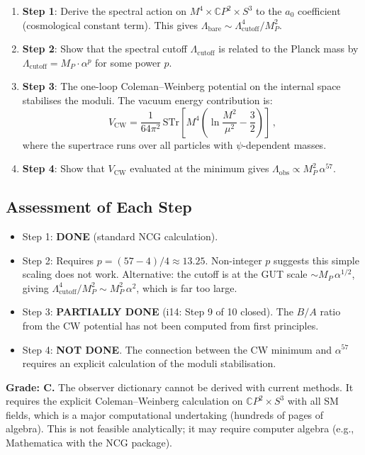 \documentclass[11pt,a4paper]{article}
\newcommand{\CP}{\mathbb{C}P}
\begin{document}
\begin{enumerate}
\item \textbf{Step 1}: Derive the spectral action on $M^4 \times \CP^2 \times S^3$ to the $a_0$ coefficient (cosmological constant term). This gives $\Lambda_{\mathrm{bare}} \sim \Lambda_{\mathrm{cutoff}}^4 / M_P^2$.

\item \textbf{Step 2}: Show that the spectral cutoff $\Lambda_{\mathrm{cutoff}}$ is related to the Planck mass by $\Lambda_{\mathrm{cutoff}} = M_P \cdot \alpha^p$ for some power $p$.

\item \textbf{Step 3}: The one-loop Coleman--Weinberg potential on the internal space stabilises the moduli. The vacuum energy contribution is:
\begin{equation}
V_{\mathrm{CW}} = \frac{1}{64\pi^2}\,\mathrm{STr}\left[M^4\left(\ln\frac{M^2}{\mu^2} - \frac{3}{2}\right)\right]\,,
\end{equation}
where the supertrace runs over all particles with $\psi$-dependent masses.

\item \textbf{Step 4}: Show that $V_{\mathrm{CW}}$ evaluated at the minimum gives $\Lambda_{\mathrm{obs}} \propto M_P^2\,\alpha^{57}$.
\end{enumerate}

\subsection{Assessment of Each Step}

\begin{itemize}
\item Step 1: \textbf{DONE} (standard NCG calculation).
\item Step 2: Requires $p = (57-4)/4 \approx 13.25$. Non-integer $p$ suggests this simple scaling does not work. Alternative: the cutoff is at the GUT scale $\sim M_P\,\alpha^{1/2}$, giving $\Lambda_{\mathrm{cutoff}}^4 / M_P^2 \sim M_P^2\,\alpha^2$, which is far too large.
\item Step 3: \textbf{PARTIALLY DONE} (i14: Step 9 of 10 closed). The $B/A$ ratio from the CW potential has not been computed from first principles.
\item Step 4: \textbf{NOT DONE}. The connection between the CW minimum and $\alpha^{57}$ requires an explicit calculation of the moduli stabilisation.
\end{itemize}

\textbf{Grade: C.} The observer dictionary cannot be derived with current methods. It requires the explicit Coleman--Weinberg calculation on $\CP^2 \times S^3$ with all SM fields, which is a major computational undertaking (hundreds of pages of algebra). This is not feasible analytically; it may require computer algebra (e.g., Mathematica with the NCG package).
\end{document}

